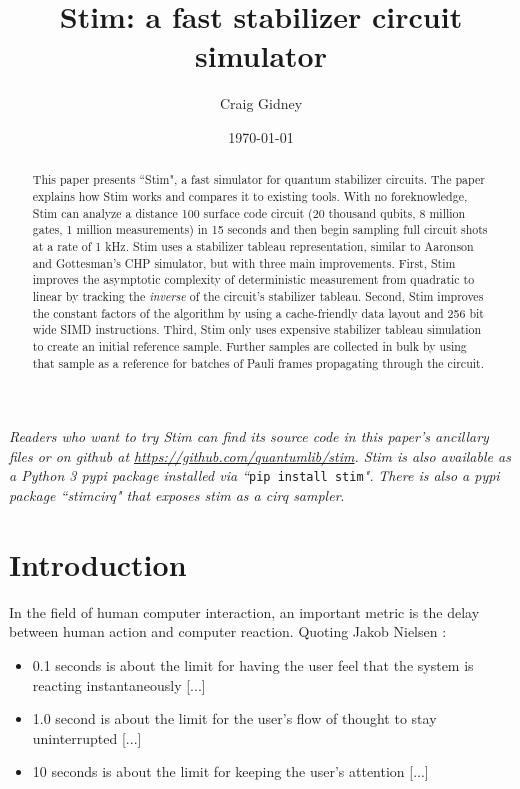 \documentclass[onecolumn,unpublished]{quantumarticle}
\theoremstyle{definition}
\theoremstyle{definition}
\theoremstyle{definition}
\begin{document}
\title{Stim: a fast stabilizer circuit simulator}

\date{\today}
\author{Craig Gidney}

\begin{abstract}
This paper presents ``Stim", a fast simulator for quantum stabilizer circuits.
The paper explains how Stim works and compares it to existing tools.
With no foreknowledge, Stim can analyze a distance 100 surface code circuit (20 thousand qubits, 8 million gates, 1 million measurements) in 15 seconds and then begin sampling full circuit shots at a rate of 1 kHz.
Stim uses a stabilizer tableau representation, similar to Aaronson and Gottesman's CHP simulator, but with three main improvements.
First, Stim improves the asymptotic complexity of deterministic measurement from quadratic to linear by tracking the {\em inverse} of the circuit's stabilizer tableau.
Second, Stim improves the constant factors of the algorithm by using a cache-friendly data layout and 256 bit wide SIMD instructions.
Third, Stim only uses expensive stabilizer tableau simulation to create an initial reference sample.
Further samples are collected in bulk by using that sample as a reference for batches of Pauli frames propagating through the circuit.
\end{abstract}

\maketitle

\emph{
Readers who want to try Stim can find its source code in this paper's ancillary files or on github at \url{https://github.com/quantumlib/stim}.
Stim is also available as a Python 3 pypi package installed via ``}\texttt{pip install stim}\emph{".}
\emph{There is also a pypi package ``stimcirq" that exposes stim as a cirq sampler}.

\section{Introduction}
\label{sec:introduction}

In the field of human computer interaction, an important metric is the delay between human action and computer reaction.
Quoting Jakob Nielsen \cite{nielsen1994usability,nielsenusabilitysite1993}:

\begin{itemize}
    \item 0.1 seconds is about the limit for having the user feel that the system is reacting instantaneously [...]
    \item 1.0 second is about the limit for the user's flow of thought to stay uninterrupted [...]
    \item 10 seconds is about the limit for keeping the user's attention [...]
\end{itemize}
\end{document}

